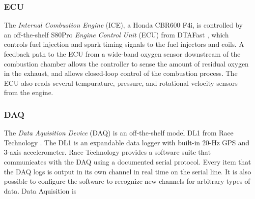 \subsubsection{ECU}


The \emph{Internal Combustion Engine} (ICE), a Honda CBR600 F4i, is controlled by an off-the-shelf S80Pro \emph{Engine Control Unit} (ECU) from DTAFast \cite{s60pro}, which controls fuel injection and spark timing signals to the fuel injectors and coils. A feedback path to the ECU from a wide-band oxygen sensor downstream of the combustion chamber allows the controller to sense the amount of residual oxygen in the exhaust, and allows closed-loop control of the combustion process. The ECU also reads several tempurature, pressure, and rotational velocity sensors from the engine.

\subsubsection{DAQ}

The \emph{Data Aquisition Device} (DAQ) is an off-the-shelf model DL1 from Race Technology \cite{DL1Dsheet}. The DL1 is an expandable data logger with built-in 20-Hz GPS and 3-axis accelerometer. Race Technology provides a software suite that communicates with the DAQ using a documented serial protocol. Every item that the DAQ logs is output in its own channel in real time on the serial line. It is also possible to configure the software to recognize new channels for arbitrary types of data.
Data Aquisition is 